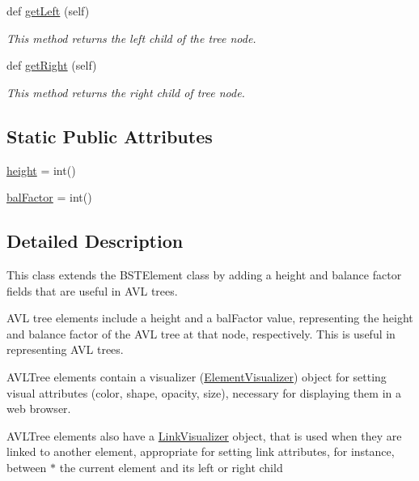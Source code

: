 \begin{DoxyCompactItemize}
def \hyperlink{class_a_v_l_tree_element_1_1_a_v_l_tree_element_a21513833c84670f79d8022300f1546e0}{get\+Left} (self)
\begin{DoxyCompactList}\small\item\em This method returns the left child of the tree node. \end{DoxyCompactList}\item 
def \hyperlink{class_a_v_l_tree_element_1_1_a_v_l_tree_element_a6bd26e8d779e5f04ef41604178061d71}{get\+Right} (self)
\begin{DoxyCompactList}\small\item\em This method returns the right child of tree node. \end{DoxyCompactList}\end{DoxyCompactItemize}
\subsection*{Static Public Attributes}
\begin{DoxyCompactItemize}
\item 
\hyperlink{class_a_v_l_tree_element_1_1_a_v_l_tree_element_acf75c045d479489e7a3add1b547d2624}{height} = int()
\item 
\hyperlink{class_a_v_l_tree_element_1_1_a_v_l_tree_element_a4fa786c8cd6c10a83b249979e19d2e2a}{bal\+Factor} = int()
\end{DoxyCompactItemize}


\subsection{Detailed Description}
This class extends the B\+S\+T\+Element class by adding a height and balance factor fields that are useful in A\+VL trees. 

A\+VL tree elements include a \textquotesingle{}height\textquotesingle{} and a \textquotesingle{}bal\+Factor\textquotesingle{} value, representing the height and balance factor of the A\+VL tree at that node, respectively. This is useful in representing A\+VL trees.

A\+V\+L\+Tree elements contain a visualizer (\hyperlink{namespace_element_visualizer}{Element\+Visualizer}) object for setting visual attributes (color, shape, opacity, size), necessary for displaying them in a web browser.

A\+V\+L\+Tree elements also have a \hyperlink{namespace_link_visualizer}{Link\+Visualizer} object, that is used when they are linked to another element, appropriate for setting link attributes, for instance, between $\ast$ the current element and its left or right child


